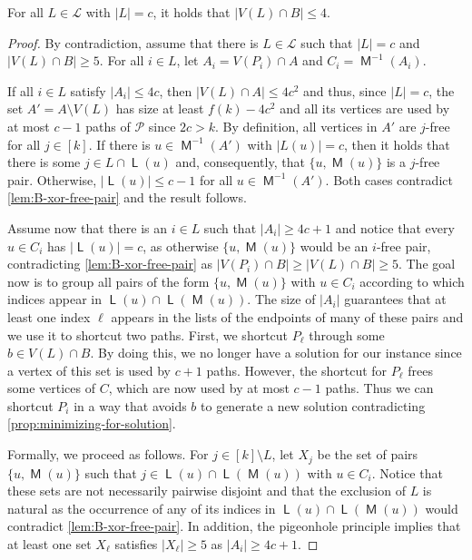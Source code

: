 \documentclass[a4paper,UKenglish,cleveref, autoref, thm-restate]{lipics-v2021}
\DeclareMathOperator{\List}{\mathsf L}
\DeclareMathOperator{\Mat}{\mathsf M}
\begin{document}
\begin{lemma}\label{lem:bounded-congested-in-B}
  For all $L \in \mathcal{L}$ with $|L| = c$, it holds that $|V(L) \cap B| \leq
  4$.
\end{lemma}
\begin{proof}
  By contradiction, assume that there is $L \in \mathcal{L}$ such that $|L| =
  c$ and $|V(L) \cap B| \geq 5$.
  For all $i \in L$, let $A_i = V(P_i) \cap A$ and $C_i = \Mat^{-1}(A_i)$.

  If all $i \in L$ satisfy $|A_i| \leq 4c$, then $|V(L) \cap A| \leq 4c^2$ and thus,
  since $|L| = c$,  the set $A' = A \setminus V(L)$ has size at least $f(k) - 4c^2$ and
  all its vertices are used by at most $c-1$ paths of $\mathcal{P}$ since $2c > k$.
  By definition, all vertices in $A'$ are $j$-free for all $j \in [k]$.
  If there is $u \in \Mat^{-1}(A')$ with $|L(u)| = c$, then it holds that there is some $j \in L \cap \List(u)$ and, consequently, that $\{u, \Mat(u)\}$ is a $j$-free pair.
  Otherwise, $|\List(u)| \leq c-1$ for all $u \in \Mat^{-1}(A')$.
  Both cases contradict \autoref{lem:B-xor-free-pair} and the result follows.

  Assume now that there is an $i \in L$ such that $|A_i| \geq 4c+1$ and notice that every
  $u \in C_i$ has $|\List(u)| = c$, as otherwise $\{u,\Mat(u)\}$ would be an $i$-free
  pair, contradicting \autoref{lem:B-xor-free-pair} as $|V(P_i) \cap B| \geq |V(L) \cap B| \geq 5$.  
  The goal now is to group all pairs of the form $\{u,\Mat(u)\}$ with $u \in C_i$
  according to which indices appear in $\List(u) \cap \List(\Mat(u))$.
  The size of $|A_i|$ guarantees that at least one index $\ell$ appears in the lists of the endpoints of many of these pairs and we use it to shortcut two paths.
  First, we shortcut $P_\ell$ through some $b \in V(L) \cap B$.
  By doing this, we no longer have a solution for our instance since a vertex of this set
  is used by $c+1$ paths.
  However, the shortcut for $P_\ell$ frees some vertices of $C$, which are now used by at
  most $c-1$ paths.
  Thus we can shortcut $P_i$ in a way that avoids $b$ to generate a new solution
  contradicting \autoref{prop:minimizing-for-solution}.


  Formally, we proceed as follows. For $j \in [k] \setminus L$, let $X_j$ be the set of pairs $\{u, \Mat(u)\}$ such that
  $j \in \List(u) \cap \List(\Mat(u))$ with $u \in C_i$.
  Notice that these sets are not necessarily pairwise disjoint and that the exclusion of $L$ is natural as the occurrence of any of its indices in $\List(u) \cap
  \List(\Mat(u))$ would contradict \autoref{lem:B-xor-free-pair}.
  In addition, the pigeonhole principle implies that at least one set $X_\ell$ satisfies
  $|X_\ell| \geq 5$ as $|A_i| \geq 4c+1$.


\end{proof}
\end{document}
